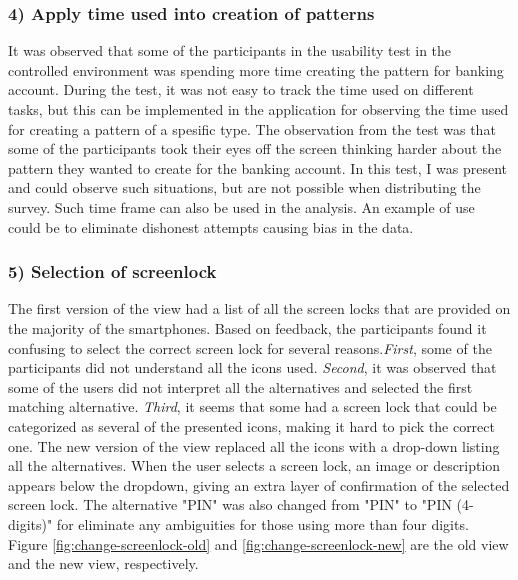     \subsubsection*{4) Apply time used into creation of patterns}
    It was observed that some of the participants in the usability test in the controlled environment was spending more time creating the pattern for banking account. During the test, it was not easy to track the time used on different tasks, but this can be implemented in the application for observing the time used for creating a pattern of a spesific type.
    The observation from the test was that some of the participants took their eyes off the screen thinking harder about the pattern they wanted to create for the banking account. In this test, I was present and could observe such situations, but are not possible when distributing the survey. Such time frame can also be used in the analysis. An example of use could be to eliminate dishonest attempts causing bias in the data. 
  

    \subsubsection*{5) Selection of screenlock}
    The first version of the view had a list of all the screen locks that are provided on the majority of the smartphones. Based on feedback, the participants found it confusing to select the correct screen lock for several reasons.{\it First}, some of the participants did not understand all the icons used. {\it Second}, it was observed that some of the users did not interpret all the alternatives and selected the first matching alternative. {\it Third}, it seems that some had a screen lock that could be categorized as several of the presented icons, making it hard to pick the correct one. The new version of the view replaced all the icons with a drop-down listing all the alternatives. When the user selects a screen lock, an image or description appears below the dropdown, giving an extra layer of confirmation of the selected screen lock. The alternative "PIN" was also changed from "PIN" to "PIN (4-digits)" for eliminate any ambiguities for those using more than four digits. Figure \ref{fig:change-screenlock-old} and \ref{fig:change-screenlock-new} are the old view and the new view, respectively.
    
